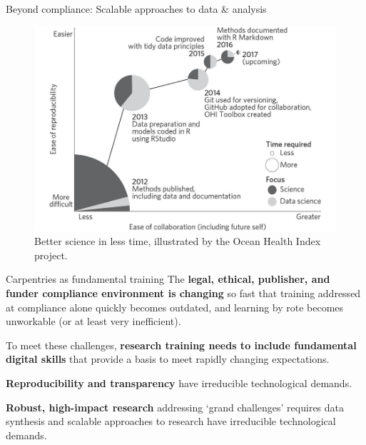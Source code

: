 \documentclass[aspectratio=169, 11pt]{beamer} %
\begin{document}
\begin{frame}{Beyond compliance: Scalable approaches to data \& analysis}
  \begin{figure}[H]
    \centering
        \includegraphics[height=.7\textheight]{figures/Ocean-Health-Index.jpg}
        \caption{Better science in less time, illustrated by the Ocean Health Index project. \cite{Stewart_Lowndes2017-lj}}
        \label{fig:stewart_lowndes}
  \end{figure}
\end{frame}

\begin{frame}{Carpentries as fundamental training}
     The \textbf{legal, ethical, publisher, and funder compliance environment is changing} so fast that training addressed at compliance alone quickly becomes outdated, and learning by rote becomes unworkable (or at least very inefficient). \par
     To meet these challenges, \textbf{research training needs to include fundamental digital skills} that provide a basis to meet rapidly changing expectations. \par
     \textbf{Reproducibility and transparency} have irreducible technological demands. \par
     \textbf{Robust, high-impact research} addressing `grand challenges'  requires data synthesis and scalable approaches to research have  irreducible technological demands.
\end{frame}
\end{document}
